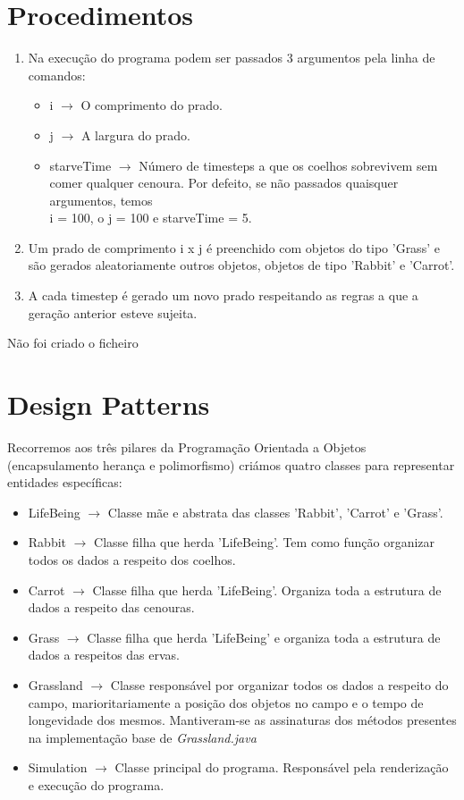 \documentclass {report}
\begin{document}
\section* {Procedimentos}
\begin{enumerate}
  \item Na execução do programa podem ser passados 3 argumentos pela linha de comandos:
		\begin{itemize}
			\item i \(\rightarrow\) O comprimento do prado.
			\item j \(\rightarrow\) A largura do prado. 
			\item starveTime \(\rightarrow\) Número de timesteps a que os coelhos 
					  sobrevivem sem comer qualquer cenoura. Por defeito, se não passados 
						quaisquer argumentos, temos \\i = 100, o j = 100 e starveTime = 5.
		\end{itemize}
	\item Um prado de comprimento i x j é preenchido com objetos do tipo 'Grass'
				e são gerados aleatoriamente outros objetos, objetos de tipo 'Rabbit' e 
				'Carrot'.
	\item A cada timestep é gerado um novo prado respeitando as regras a que
				a geração anterior esteve sujeita.
\end{enumerate}
Não foi criado o ficheiro 

\section*{Design Patterns}
	Recorremos aos três pilares da Programação Orientada a Objetos (encapsulamento 
	herança e polimorfismo) criámos quatro classes para representar entidades
	específicas:
	\begin{itemize}
		\item	LifeBeing \(\rightarrow\) Classe mãe e abstrata das classes 'Rabbit',
					'Carrot' e 'Grass'.
		\item	Rabbit \(\rightarrow\) Classe filha que herda 'LifeBeing'. Tem como função 
					organizar todos os dados a respeito dos coelhos.
		\item	Carrot \(\rightarrow\) Classe filha que herda 'LifeBeing'. Organiza 
					toda a estrutura de dados a respeito das cenouras.
		\item	Grass \(\rightarrow\) Classe filha que herda 'LifeBeing' e organiza 
					toda a estrutura de dados a respeitos das ervas.
		\item Grassland \(\rightarrow\) Classe responsável por organizar todos os
					dados a respeito do campo, marioritariamente a posição dos objetos
					no campo e o tempo de longevidade dos mesmos. Mantiveram-se as assinaturas dos métodos presentes na implementação base de \textit{Grassland.java}
		\item Simulation \(\rightarrow\) Classe principal do programa. Responsável
					pela renderização e execução do programa.
	\end{itemize}
\end{document}

